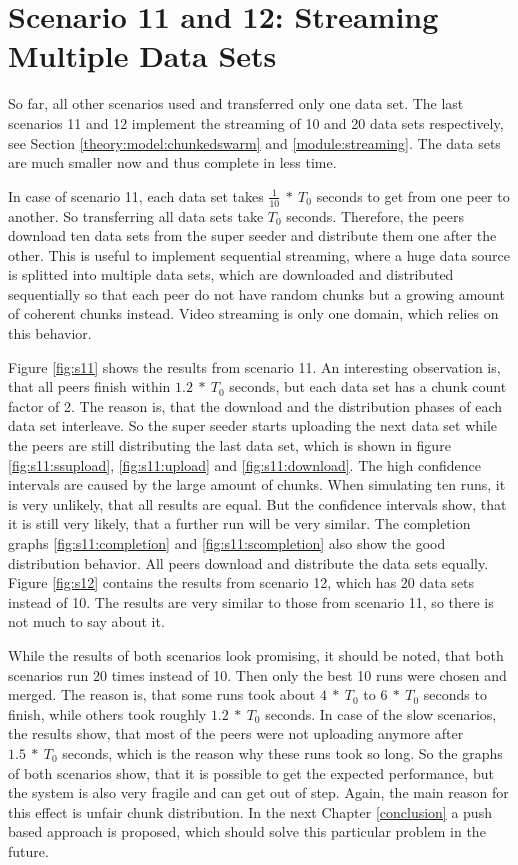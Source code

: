 \pagebreak
\section{Scenario 11 and 12: Streaming Multiple Data Sets}
\label{evaluation:1112}

So far, all other scenarios used and transferred only one data set. The last scenarios 11 and 12 implement the streaming of 10 and 20 data sets respectively, see Section \ref{theory:model:chunkedswarm} and \ref{module:streaming}. The data sets are much smaller now and thus complete in less time.

In case of scenario 11, each data set takes $\frac{1}{10}\:*\:T_0$ seconds to get from one peer to another. So transferring all data sets take $T_0$ seconds. Therefore, the peers download ten data sets from the super seeder and distribute them one after the other. This is useful to implement sequential streaming, where a huge data source is splitted into multiple data sets, which are downloaded and distributed sequentially so that each peer do not have random chunks but a growing amount of coherent chunks instead. Video streaming is only one domain, which relies on this behavior.

Figure \ref{fig:s11} shows the results from scenario 11. An interesting observation is, that all peers finish within $1.2\:*\:T_0$ seconds, but each data set has a chunk count factor of 2. The reason is, that the download and the distribution phases of each data set interleave. So the super seeder starts uploading the next data set while the peers are still distributing the last data set, which is shown in figure \ref{fig:s11:ssupload}, \ref{fig:s11:upload} and \ref{fig:s11:download}. The high confidence intervals are caused by the large amount of chunks. When simulating ten runs, it is very unlikely, that all results are equal. But the confidence intervals show, that it is still very likely, that a further run will be very similar. The completion graphs \ref{fig:s11:completion} and \ref{fig:s11:scompletion} also show the good distribution behavior. All peers download and distribute the data sets equally. Figure \ref{fig:s12} contains the results from scenario 12, which has 20 data sets instead of 10. The results are very similar to those from scenario 11, so there is not much to say about it.

While the results of both scenarios look promising, it should be noted, that both scenarios run 20 times instead of 10. Then only the best 10 runs were chosen and merged. The reason is, that some runs took about $4\:*\:T_0$ to $6\:*\:T_0$ seconds to finish, while others took roughly $1.2\:*\:T_0$ seconds. In case of the slow scenarios, the results show, that most of the peers were not uploading anymore after $1.5\:*\:T_0$ seconds, which is the reason why these runs took so long. So the graphs of both scenarios show, that it is possible to get the expected performance, but the system is also very fragile and can get out of step. Again, the main reason for this effect is unfair chunk distribution. In the next Chapter \ref{conclusion} a push based approach is proposed, which should solve this particular problem in the future.
